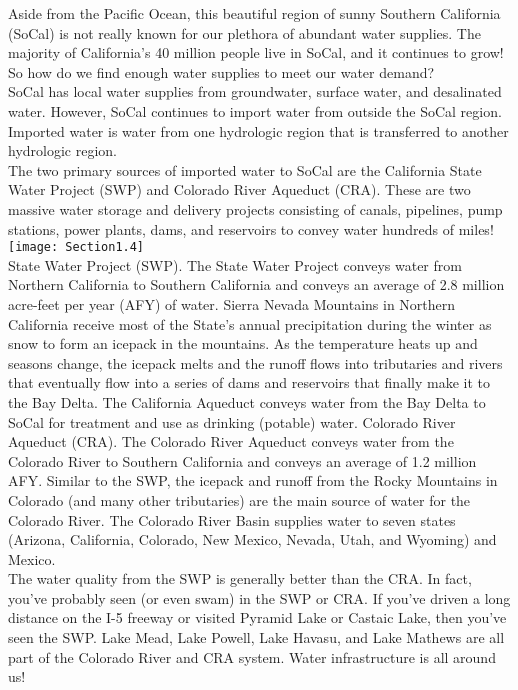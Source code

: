 \documentclass{article}
\begin{document}
Aside from the Pacific Ocean, this beautiful region of sunny Southern California (SoCal) is not really known for our plethora of abundant water supplies.  The majority of California's 40 million people live in SoCal, and it continues to grow!   So how do we find enough water supplies to meet our water demand?\\

SoCal has local water supplies from groundwater, surface water, and desalinated water.  However, SoCal continues to import water from outside the SoCal region.  Imported water is water from one hydrologic region that is transferred to another hydrologic region.\\

The two primary sources of imported water to SoCal are the California State Water Project (SWP) and Colorado River Aqueduct (CRA).  These are two massive water storage and delivery projects consisting of canals, pipelines, pump stations, power plants, dams, and reservoirs to convey water hundreds of miles!\\

\texttt{[image: Section1.4]}\\

State Water Project (SWP).  The State Water Project conveys water from Northern California to Southern California and conveys an average of 2.8 million acre-feet per year (AFY) of water.  Sierra Nevada Mountains in Northern California receive most of the State's annual precipitation during the winter as snow to form an icepack in the mountains.  As the temperature heats up and seasons change, the icepack melts and the runoff flows into tributaries and rivers that eventually flow into a series of dams and reservoirs that finally make it to the Bay Delta.  The California Aqueduct conveys water from the Bay Delta to SoCal for treatment and use as drinking (potable) water.
Colorado River Aqueduct (CRA).  The Colorado River Aqueduct conveys water from the Colorado River to Southern California and conveys an average of 1.2 million AFY.  Similar to the SWP, the icepack and runoff from the Rocky Mountains in Colorado (and many other tributaries) are the main source of water for the Colorado River.  The Colorado River Basin supplies water to seven states (Arizona, California, Colorado, New Mexico, Nevada, Utah, and Wyoming) and Mexico.\\

The water quality from the SWP is generally better than the CRA.  In fact, you've probably seen (or even swam) in the SWP or CRA.  If you've driven a long distance on the I-5 freeway or visited Pyramid Lake or Castaic Lake, then you've seen the SWP.  Lake Mead, Lake Powell, Lake Havasu, and Lake Mathews are all part of the Colorado River and CRA system.  Water infrastructure is all around us!\\
\end{document}
